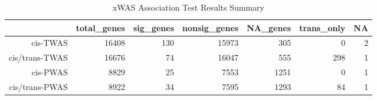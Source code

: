 \begin{table}[H]
\centering
\caption{xWAS Association Test Results Summary} 
\label{tab:summary}
\begin{tabular}{rrrrrrr}
  \toprule
 & total_genes & sig_genes & nonsig_genes & NA_genes & trans_only & NA \\ 
  \midrule
cis-TWAS & 16408 & 130 & 15973 & 305 &   0 &   2 \\ 
  cis/trans-TWAS & 16676 &  74 & 16047 & 555 & 298 &   1 \\ 
  cis-PWAS & 8829 &  25 & 7553 & 1251 &   0 &   1 \\ 
  cis/trans-PWAS & 8922 &  34 & 7595 & 1293 &  84 &   1 \\ 
   \bottomrule
\end{tabular}
\end{table}
\pagebreak


